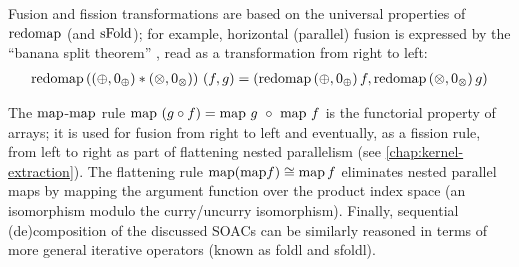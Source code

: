 Fusion and fission transformations are based on the universal
properties of $\mathrm{redomap}$ (and $\mathrm{sFold}$); for example, horizontal
(parallel) fusion is expressed by the ``banana split theorem''
\cite{mfp91}, read as a transformation from right to left:
\[
   \begin{array}{l}
  \mathrm{redomap}\, ((\oplus, 0_{\oplus}) * (\otimes, 0_{\otimes})) ~ (f, g) =(\mathrm{redomap}\, (\oplus, 0_{\oplus})\, f, \mathrm{redomap}\, (\otimes,
     0_{\otimes})\, g )
   \end{array}
\]

The $\mathrm{map}$-$\mathrm{map}$ rule
$\mathrm{map} ~ (g \circ f) = \mathrm{map} ~ g ~ \circ ~ \mathrm{map} ~ f$ is the
functorial property of arrays; it is used for fusion from right to
left and eventually, as a fission rule, from left to right as part of
flattening nested parallelism (see \cref{chap:kernel-extraction}).
%
The flattening rule
$ \mathrm{map} (\mathrm{map} f) \cong \mathrm{map} \,f$
eliminates nested parallel maps by mapping the argument function over
the product index space (an isomorphism modulo the
curry/uncurry isomorphism).
Finally, sequential (de)composition of the discussed SOACs
can be similarly reasoned in terms of more general iterative operators
(known as foldl and sfoldl).

